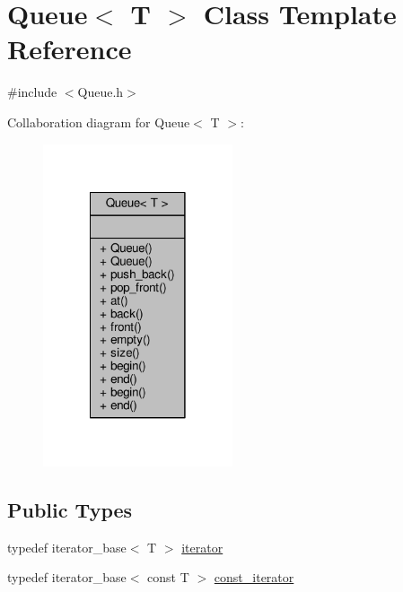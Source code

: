 \hypertarget{classQueue}{\section{Queue$<$ T $>$ Class Template Reference}
\label{classQueue}
}


{\ttfamily \#include $<$Queue.\-h$>$}



Collaboration diagram for Queue$<$ T $>$\-:\nopagebreak
\begin{figure}[H]
\begin{center}
\leavevmode
\includegraphics[width=158pt]{classQueue__coll__graph}
\end{center}
\end{figure}
\subsection*{Public Types}
\begin{DoxyCompactItemize}
\item 
typedef iterator\-\_\-base$<$ T $>$ \hyperlink{classQueue_abc9e9289124dc3ae5377a7e3d3fbe928}{iterator}
\item 
typedef iterator\-\_\-base$<$ const T $>$ \hyperlink{classQueue_a10a22f024abb831966e98b859bb2e64d}{const\-\_\-iterator}
\end{DoxyCompactItemize}
